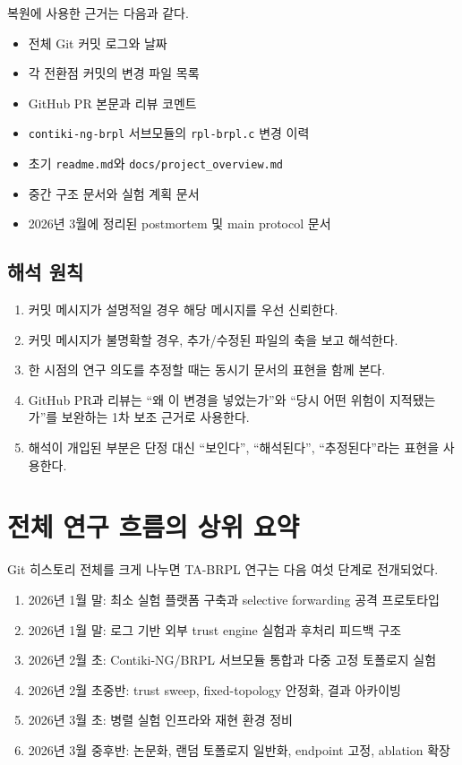 \documentclass[12pt,a4paper]{article}
\begin{document}
복원에 사용한 근거는 다음과 같다.

\begin{itemize}[leftmargin=1.5em]
\item 전체 Git 커밋 로그와 날짜
\item 각 전환점 커밋의 변경 파일 목록
\item GitHub PR 본문과 리뷰 코멘트
\item \texttt{contiki-ng-brpl} 서브모듈의 \texttt{rpl-brpl.c} 변경 이력
\item 초기 \texttt{readme.md}와 \texttt{docs/project\_overview.md}
\item 중간 구조 문서와 실험 계획 문서
\item 2026년 3월에 정리된 postmortem 및 main protocol 문서
\end{itemize}

\subsection{해석 원칙}

\begin{enumerate}[leftmargin=1.5em]
\item 커밋 메시지가 설명적일 경우 해당 메시지를 우선 신뢰한다.
\item 커밋 메시지가 불명확할 경우, 추가/수정된 파일의 축을 보고 해석한다.
\item 한 시점의 연구 의도를 추정할 때는 동시기 문서의 표현을 함께 본다.
\item GitHub PR과 리뷰는 ``왜 이 변경을 넣었는가''와 ``당시 어떤 위험이 지적됐는가''를
보완하는 1차 보조 근거로 사용한다.
\item 해석이 개입된 부분은 단정 대신 ``보인다'', ``해석된다'', ``추정된다''라는
표현을 사용한다.
\end{enumerate}

\section{전체 연구 흐름의 상위 요약}

Git 히스토리 전체를 크게 나누면 TA-BRPL 연구는 다음 여섯 단계로 전개되었다.

\begin{enumerate}[leftmargin=1.5em]
\item 2026년 1월 말: 최소 실험 플랫폼 구축과 selective forwarding 공격 프로토타입
\item 2026년 1월 말: 로그 기반 외부 trust engine 실험과 후처리 피드백 구조
\item 2026년 2월 초: Contiki-NG/BRPL 서브모듈 통합과 다중 고정 토폴로지 실험
\item 2026년 2월 초중반: trust sweep, fixed-topology 안정화, 결과 아카이빙
\item 2026년 3월 초: 병렬 실험 인프라와 재현 환경 정비
\item 2026년 3월 중후반: 논문화, 랜덤 토폴로지 일반화, endpoint 고정, ablation 확장
\end{enumerate}
\end{document}

